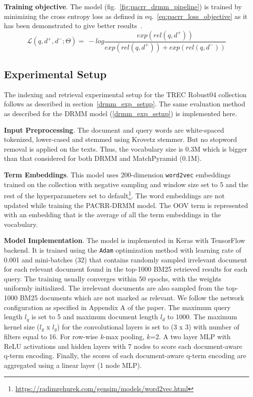 \textbf{Training objective}. The model (fig.~\ref{fig:pacrr_drmm_pipeline}) is trained by minimizing the cross entropy loss as defined in eq.~\ref{eq:pacrr_loss_objective} as it has been demonstrated to give better results~\citep{Dehghani_sigir17}.
\begin{equation}\label{eq:pacrr_loss_objective}
    \mathcal{L}(q,d^+,d^-;\Theta) = \
    -log\frac{exp(rel(q,d^+))}{exp(rel(q,d^+)) + exp(rel(q,d^-))}
\end{equation}

\subsection{Experimental Setup}
The indexing and retrieval experimental setup for the TREC Robust04 collection follows as described in section~\ref{drmm_exp_setup}. The same evaluation method as described for the DRMM model (\ref{drmm_exp_setup}) is implemented here.

\textbf{Input Preprocessing}. The document and query words are white-spaced tokenized, lower-cased and stemmed using Krovetz stemmer. But no stopword removal is applied on the texts. Thus, the vocabulary size is 0.3M which is bigger than that considered for both DRMM and MatchPyramid (0.1M). 

\textbf{Term Embeddings}. This model uses 200-dimension \texttt{word2vec} embeddings trained on the collection with negative sampling and window size set to 5 and the rest of the hyperparameters set to default\footnote{\url{https://radimrehurek.com/gensim/models/word2vec.html}}. The word embeddings are not updated while training the PACRR-DRMM model. The OOV term is represented with an embedding that is the average of all the term embeddings in the vocabulary.

\textbf{Model Implementation}. The model is implemented in Keras with TensorFlow backend. It is trained using the \texttt{Adam} optimization method with learning rate of 0.001 and mini-batches (32) that contains randomly sampled irrelevant document for each relevant document found in the top-1000 BM25 retrieved results for each query. The training usually converges within 50 epochs, with the weights uniformly initialized. The irrelevant documents are also sampled from the top-1000 BM25 documents which are not marked as relevant. We follow the network configuration as specified in Appendix A of the paper. The maximum query length $l_q$ is set to 5 and maximum document length $l_d$ to 1000. The maximum kernel size ($l_g$ x $l_g$) for the convolutional layers is set to (3 x 3) with number of filters equal to 16. For row-wise \textit{k}-max pooling, $k$=2. A two layer MLP with ReLU activations and hidden layers with 7 nodes to score each document-aware q-term encoding. Finally, the scores of each document-aware q-term encoding are aggregated using a linear layer (1 node MLP). 

